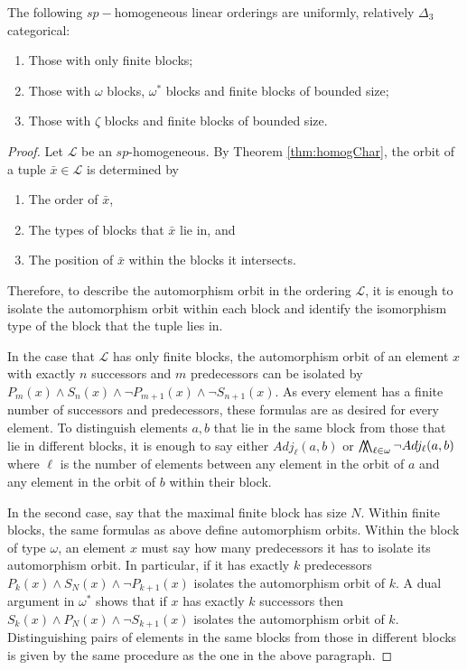 \documentclass[11pt]{amsart}
\theoremstyle{definition}
\newcommand{\bigwwedge}{%
  \mathop{
    \mathchoice{\bigwedge\mkern-15mu\bigwedge}
               {\bigwedge\mkern-12.5mu\bigwedge}
               {\bigwedge\mkern-12.5mu\bigwedge}
               {\bigwedge\mkern-11mu\bigwedge}
    }
}
\def\L{\mathcal L}
\begin{document}
\begin{proposition}\label{prop:Delta3begin}
    The following $sp-$homogeneous linear orderings are uniformly, relatively $\Delta_3$ categorical:
    \begin{enumerate}
        \item Those with only finite blocks;
        \item Those with $\omega$ blocks, $\omega^*$ blocks and finite blocks of bounded size;
        \item Those with $\zeta$ blocks and finite blocks of bounded size.
    \end{enumerate}
\end{proposition}

\begin{proof}
Let $\L$ be an $sp$-homogeneous.
By Theorem \ref{thm:homogChar}, the orbit of a tuple $\bar{x}\in\L$ is determined by
\begin{enumerate}
    \item The order of $\bar{x}$,
    \item The types of blocks that $\bar{x}$ lie in, and
    \item The position of $\bar{x}$ within the blocks it intersects.
\end{enumerate}
Therefore, to describe the automorphism orbit in the ordering $\L$, it is enough to isolate the automorphism orbit within each block and identify the isomorphism type of the block that the tuple lies in.

In the case that $\L$ has only finite blocks, the automorphism orbit of an element $x$ with exactly $n$ successors and $m$ predecessors can be isolated by $P_m(x)\land S_n(x)\land \lnot P_{m+1}(x)\land \lnot S_{n+1}(x)$. 
As every element has a finite number of successors and predecessors, these formulas are as desired for every element.
To distinguish elements $a,b$ that lie in the same block from those that lie in different blocks, it is enough to say either $Adj_\ell(a,b)$ or $\bigwwedge_{\ell\in\omega}\lnot Adj_\ell(a,b)$ where $\ell$ is the number of elements between any element in the orbit of $a$ and any element in the orbit of $b$ within their block.

In the second case, say that the maximal finite block has size $N$.
Within finite blocks, the same formulas as above define automorphism orbits.
Within the block of type $\omega$, an element $x$ must say how many predecessors it has to isolate its automorphism orbit.
In particular, if it has exactly $k$ predecessors $P_k(x)\land S_N(x)\land \lnot P_{k+1}(x)$ isolates the automorphism orbit of $k$.
A dual argument in $\omega^*$ shows that if $x$ has exactly $k$ successors then $S_k(x)\land P_N(x)\land \lnot S_{k+1}(x)$ isolates the automorphism orbit of $k$.
Distinguishing pairs of elements in the same blocks from those in different blocks is given by the same procedure as the one in the above paragraph.


\end{proof}
\end{document}
